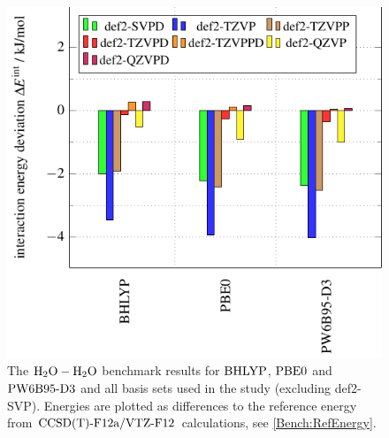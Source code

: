 \begin{figure}[b!]
\centering
% 
% 
% 
\includegraphics[width=.7\textwidth]{TikzPics/TikzCreation/Bench/BenchH2O+H2O.BasisCompare.pdf}
\caption{The $\mbox{\ensuremath{\text H _2 \text O-\text H _2 \text O}}$ benchmark results for $\text{BHLYP}$, $\text{PBE0}$ and $\text{PW6B95}\text{-D3}$ and all
basis sets used in the study (excluding \mbox{def2-SVP}). Energies are plotted as differences
to the reference energy from $\text{CCSD(T)-F12a}/\text{VTZ-F}12$ calculations, see \eqref{Bench:RefEnergy}.}
\label{Fig:Bench:H2O+H2O:BasisCompare}
\end{figure}

